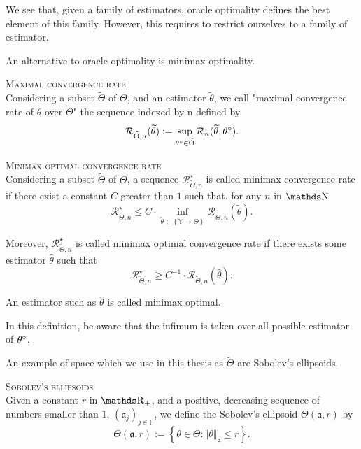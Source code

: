 \begin{Liste}[]
We see that, given a family of estimators, oracle optimality defines the best element of this family. However, this requires to restrict ourselves to a family of estimator.

\item[\mylabel{INTRO_FREQ_DECISION_MINIMAXOPT}{ \bfseries{Minimax optimality}}]

An alternative to oracle optimality is minimax optimality.

\begin{de}{\textsc{Maximal convergence rate} \\}\label{DE_INTRO_FREQ_DECISION_MINIMAXOPT_MAXRATE}
Considering a subset $\widetilde{\Theta}$ of $\Theta$, and an estimator $\widetilde{\theta}$, we call "maximal convergence rate of $\widetilde{\theta}$ over $\widetilde{\Theta}$" the sequence indexed by n defined by
\[\mathcal{R}_{\widetilde{\Theta}, n}(\widetilde{\theta}) := \sup\limits_{{\theta^{\circ}_{}} \in \widetilde{\Theta}} \mathcal{R}_{n}(\widetilde{\theta}, {\theta^{\circ}_{}}).\]
\end{de}

\begin{de}{\textsc{Minimax optimal convergence rate} \\}\label{DE_INTRO_FREQ_DECISION_MINIMAXOPT_OPTRATE}
Considering a subset $\widetilde{\Theta}$ of $\Theta$, a sequence $\mathcal{R}_{\widetilde{\Theta}, n}^{\star}$ is called minimax convergence rate if there exist a constant $C$ greater than $1$ such that, for any $n$ in $\N$ 
\[\mathcal{R}_{\widetilde{\Theta}, n}^{\star} \leq C \cdot \inf\limits_{\widetilde{\theta} \in \left\{\mathds{Y} \rightarrow \Theta\right\}} \mathcal{R}_{\widetilde{\Theta}, n}(\widetilde{\theta}).\]

Moreover, $\mathcal{R}_{\widetilde{\Theta}, n}^{\star}$ is called minimax optimal convergence rate if there exists some estimator $\widehat{\theta}$ such that
\[\mathcal{R}_{\widetilde{\Theta}, n}^{\star} \geq C^{-1} \cdot \mathcal{R}_{\widetilde{\Theta}, n}(\widehat{\theta}).\]

An estimator such as $\widehat{\theta}$ is called minimax optimal.
\end{de}
In this definition, be aware that the infimum is taken over all possible estimator of ${\theta^{\circ}_{}}$.

An example of space which we use in this thesis as $\widetilde{\Theta}$ are Sobolev's ellipsoids.
\begin{de}{\textsc{Sobolev's ellipsoids} \\}\label{DE_INTRO_FREQ_DECISION_MINIMAXOPT_SOBOL}
Given a constant $r$ in $\R_{+}$, and a positive, decreasing sequence of numbers smaller than $1$, $\left(\mathfrak{a}_{j}\right)_{j \in \mathds{F}}$, we define the Sobolev's ellipsoid $\Theta(\mathfrak{a}, r)$ by
\[\Theta(\mathfrak{a}, r) := \left\{\theta \in \Theta: \Vert \theta \Vert_{\mathfrak{a}} \leq r \right\}.\]
\end{de}


\end{Liste}
